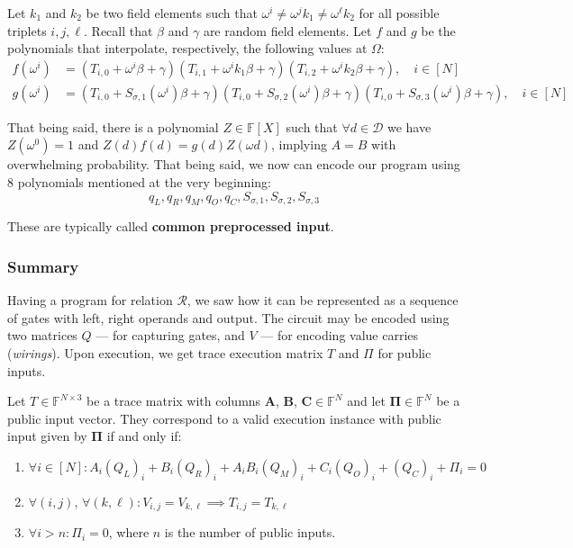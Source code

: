 \documentclass[../lecture-notes.tex]{subfiles}
\begin{document}
Let $k_1$ and $k_2$ be two field elements such that $\omega^i \neq \omega^j k_1
\neq \omega^{\ell} k_2$ for all possible triplets $i, j, \ell$. Recall that
$\beta$ and $\gamma$ are random field elements. Let $f$ and $g$ be the
polynomials that interpolate, respectively, the following values at $\Omega$:
\begin{align*}
    f(\omega^i) &=\left(T_{i,0} + \omega^i \beta + \gamma\right)\left(T_{i,1} + \omega^i k_1 \beta + \gamma\right)\left(T_{i,2} + \omega^i k_2 \beta + \gamma\right), \quad i \in [N] \\
    g(\omega^i) &= \left(T_{i,0} + S_{\sigma,1}(\omega^i) \beta + \gamma\right)\left(T_{i,0} + S_{\sigma,2}(\omega^i) \beta + \gamma\right)\left(T_{i,0} + S_{\sigma,3}(\omega^i) \beta + \gamma\right), \quad i \in [N]
\end{align*}

That being said, there is a polynomial $Z \in \mathbb{F}[X]$ such that $\forall
d \in \mathcal{D}$ we have $Z(\omega^{0}) = 1$ and $Z(d)f(d) = g(d)Z(\omega d)$,
implying $A = B$ with overwhelming probability. That being said, we now can
encode our program using 8 polynomials mentioned at the very beginning:
\[q_L, q_R, q_M, q_O, q_C, S_{\sigma,1}, S_{\sigma,2}, S_{\sigma,3}\]

These are typically called \textbf{common preprocessed input}.

\subsubsection{Summary}
Having a program for relation $\mathcal{R}$, we saw how it can be represented as
a sequence of gates with left, right operands and output. The circuit may be
encoded using two matrices $Q$ --- for capturing gates, and $V$ --- for encoding
value carries (\textit{wirings}). Upon execution, we get trace execution matrix
$T$ and $\Pi$ for public inputs.

\begin{definition}
Let $T \in \mathbb{F}^{N \times 3}$ be a trace matrix with columns $\mathbf{A}$,
$\mathbf{B}$, $\mathbf{C} \in \mathbb{F}^N$ and let $\boldsymbol{\Pi} \in
\mathbb{F}^N$ be a public input vector. They correspond to a valid execution
instance with public input given by $\boldsymbol{\Pi}$ if and only if:
\begin{enumerate}
    \item \(\forall i \in [N]: A_i(Q_{L})_i + B_i(Q_{R})_i + A_iB_i(Q_{M})_i + C_i(Q_{O})_i + (Q_{C})_i + \Pi_i = 0\)
    \item \(\forall (i, j), \, \forall (k, \ell): V_{i,j} = V_{k,\ell} \implies T_{i,j} = T_{k,\ell}\)
    \item \(\forall i > n: \Pi_i = 0\), where $n$ is the number of public inputs.
\end{enumerate}
\end{definition}
\end{document}
